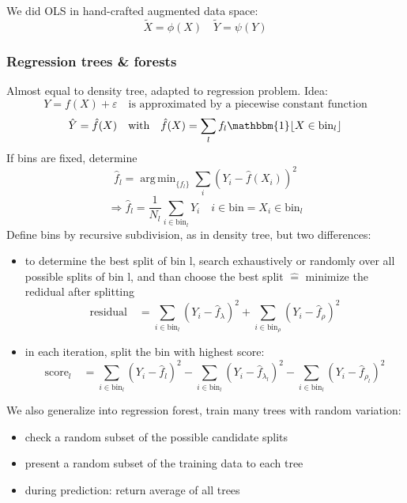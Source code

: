 \documentclass[11pt]{article}
\DeclareMathOperator*{\argmin}{arg\,min}
\DeclarePairedDelimiter\floor{\lfloor}{\rfloor}
\begin{document}
    We did OLS in hand-crafted augmented data space:
    \begin{equation*}
      \tilde{X}=\phi(X) \quad \tilde{Y}=\psi(Y)
    \end{equation*}
    \subsubsection{Regression trees \& forests}
    Almost equal to density tree, adapted to regression problem. Idea:
    \begin{equation*}
      Y=f(X)+\varepsilon \quad \text{is approximated by a piecewise constant function}
    \end{equation*}
    \begin{equation*}
      \hat{Y}=\hat{f}(X) \quad \text{with} \quad \hat{f}(X)=\sum_l f_l \mathbbm{1}\floor{X \in \text{bin}_l}
    \end{equation*}
    If bins are fixed, determine
    \begin{equation*}
      \hat{f}_l=\argmin_{\{ f_l \}} \sum_i (Y_i-\hat{f}(X_i))^2
    \end{equation*}
    \begin{equation*}
      \Rightarrow \hat{f}_l=\frac{1}{N_l} \sum_{i \in \text{bin}_l} Y_i
      \quad i \in \text{bin} \widehat{=} X_i \in \text{bin}_l
    \end{equation*}
    Define bins by recursive subdivision, as in density tree, but two differences:
    \begin{itemize}
      \item to determine the best split of bin l, search exhaustively or
      randomly over all possible splits of bin l, and than choose the best split
      $\widehat{=}$ minimize the redidual after splitting
      \begin{equation*}
        \text{residual} \quad = \sum_{i \in \text{bin}_l} (Y_i-\hat{f}_\lambda)^2+\sum_{i \in \text{bin}_
        \rho}(Y_i -\hat{f}_\rho)^2
      \end{equation*}
      \item in each iteration, split the bin with highest score:
      \begin{equation*}
        \text{score}_l \quad = \sum_{i \in \text{bin}_l}(Y_i-\hat{f}_l)^2-
        \sum_{i \in \text{bin}_l}(Y_i-\hat{f}_{\lambda_l})^2-
        \sum_{i \in \text{bin}_l}(Y_i-\hat{f}_{\rho_l})^2
      \end{equation*}
    \end{itemize}
    We also generalize into regression forest, train many trees with random variation:
    \begin{itemize}
      \item check a random subset of the possible candidate splits
      \item present a random subset of the training data to each tree
      \item during prediction: return average of all trees
    \end{itemize}
\end{document}

